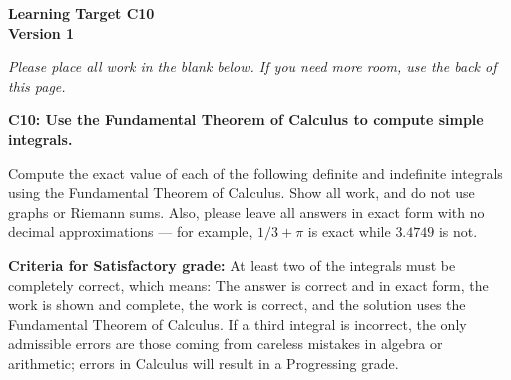 \documentclass[10pt]{article}
\begin{document}
	\vspace*{0in}

		\begin{center}
			\textbf{Learning Target C10 \\
			Version 1} \\
		\end{center}

\emph{Please place all work in the blank below. If you need more room, use the back of this page.}

\begin{framed}
	\textbf{\textbf{C10:} Use the Fundamental Theorem of Calculus to compute simple integrals.}
\end{framed}

Compute the exact value of each of the following definite and indefinite integrals using the Fundamental Theorem of Calculus. Show all work, and do not use graphs or Riemann sums. Also, please leave all answers in exact form with no decimal approximations --- for example, $1/3 + \pi$ is exact while $3.4749$ is not. 


\begin{enumerate}
    \item $\displaystyle{\int_0^1 (x^3 -x^2 + 2) \, dx}$
    \item $\displaystyle{\int_0^{\pi/2} (\sin(t) + 2 \cos(t)) \, dt$
    \item $\displaystyle{\int_1^2 (\sqrt{x} - x^2) \, dx}$
\end{enumerate}

\vfill


\begin{small}
    \begin{framed}
        	\textbf{Criteria for Satisfactory grade:} At least two of the integrals must be completely correct, which means: The answer is correct and in exact form, the work is shown and complete, the work is correct, and the solution uses the Fundamental Theorem of Calculus. If a third integral is incorrect, the only admissible errors are those coming from careless mistakes in algebra or arithmetic; errors in Calculus will result in a Progressing grade. 
    \end{framed}

\end{small}
\end{document}
